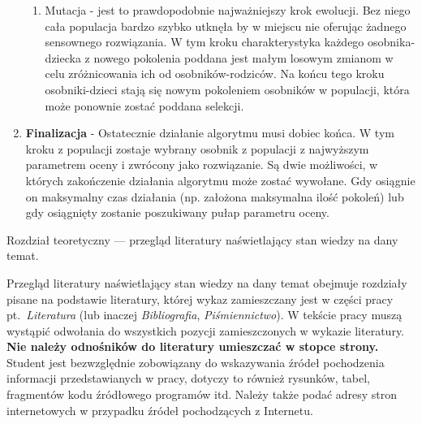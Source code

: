 \begin{enumerate}
\begin{enumerate}
		\item Mutacja - jest to prawdopodobnie najważniejszy krok ewolucji. Bez niego cała populacja bardzo szybko utknęła by w miejscu nie oferując żadnego sensownego rozwiązania. W tym kroku charakterystyka każdego osobnika-dziecka z nowego pokolenia poddana jest małym losowym zmianom w celu zróżnicowania ich od osobników-rodziców. Na końcu tego kroku osobniki-dzieci stają się nowym pokoleniem osobników w populacji, która może ponownie zostać poddana selekcji.
	\end{enumerate}
	\item \textbf{Finalizacja} - Ostatecznie działanie algorytmu musi dobiec końca. W tym kroku z populacji zostaje wybrany osobnik z populacji z najwyższym parametrem oceny i zwrócony jako rozwiązanie. Są dwie możliwości, w których zakończenie działania algorytmu może zostać wywołane. Gdy osiągnie on maksymalny czas działania (np. założona maksymalna ilość pokoleń) lub gdy osiągnięty zostanie poszukiwany pułap parametru oceny.
	\end{enumerate}	


Rozdział teoretyczny --- przegląd literatury naświetlający stan wiedzy na dany temat. 

Przegląd literatury naświetlający stan wiedzy na dany temat obejmuje rozdziały pisane na podstawie
literatury, której wykaz zamieszczany jest w części pracy pt.~\emph{Literatura} (lub inaczej \emph{Bibliografia},
\emph{Piśmiennictwo}). W tekście pracy muszą wystąpić odwołania do wszystkich pozycji zamieszczonych w
wykazie literatury. \textbf{Nie należy odnośników do literatury umieszczać w stopce strony.} Student jest
bezwzględnie zobowiązany do wskazywania źródeł pochodzenia informacji przedstawianych w pracy,
dotyczy to również rysunków, tabel, fragmentów kodu źródłowego programów itd. Należy także podać
adresy stron internetowych w przypadku źródeł pochodzących z Internetu.


